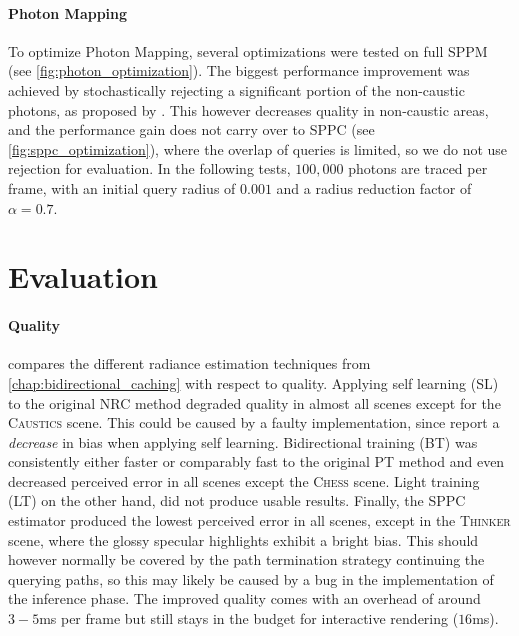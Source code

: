 \paragraph{Photon Mapping} To optimize Photon Mapping, several optimizations were tested on full SPPM (see \cref{fig:photon_optimization}).
The biggest performance improvement was achieved by stochastically rejecting a significant portion of the non-caustic photons, as proposed by \textcite{kern2023}.
This however decreases quality in non-caustic areas, and the performance gain does not carry over to SPPC (see \cref{fig:sppc_optimization}), where the overlap of queries is limited, so we do not use rejection for evaluation.
In the following tests, $100,000$ photons are traced per frame, with an initial query radius of $0.001$ and a radius reduction factor of $\alpha=0.7$.

\section{Evaluation}

\paragraph{Quality}  compares the different radiance estimation techniques from \cref{chap:bidirectional_caching} with respect to quality.
Applying self learning (SL) to the original NRC method degraded quality in almost all scenes except for the \textsc{Caustics} scene.
This could be caused by a faulty implementation, since \textcite{muller2021} report a \emph{decrease} in bias when applying self learning.
Bidirectional training (BT) was consistently either faster or comparably fast to the original PT method and even decreased perceived error in all scenes except the \textsc{Chess} scene.
Light training (LT) on the other hand, did not produce usable results.
Finally, the SPPC estimator produced the lowest perceived error in all scenes, except in the \textsc{Thinker} scene, where the glossy specular highlights exhibit a bright bias.
This should however normally be covered by the path termination strategy continuing the querying paths, so this may likely be caused by a bug in the implementation of the inference phase.
The improved quality comes with an overhead of around $3-5$ms per frame but still stays in the budget for interactive rendering ($16$ms).

